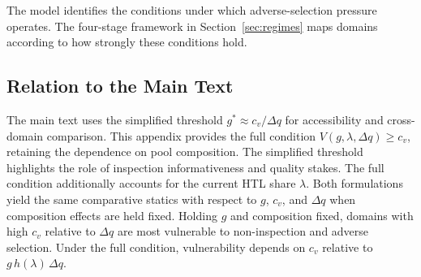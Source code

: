 \documentclass{article}
\theoremstyle{plain}
\theoremstyle{definition}
\theoremstyle{remark}
\begin{document}
The model identifies the conditions under which adverse-selection pressure operates. The four-stage framework in Section~\ref{sec:regimes} maps domains according to how strongly these conditions hold.

\subsection{Relation to the Main Text}
\label{app:relation}

The main text uses the simplified threshold $g^{\ast}\approx c_v/\Delta q$ for accessibility and cross-domain comparison. This appendix provides the full condition $V(g,\lambda,\Delta q)\geq c_v$, retaining the dependence on pool composition. The simplified threshold highlights the role of inspection informativeness and quality stakes. The full condition additionally accounts for the current HTL share $\lambda$. Both formulations yield the same comparative statics with respect to $g$, $c_v$, and $\Delta q$ when composition effects are held fixed. Holding $g$ and composition fixed, domains with high $c_v$ relative to $\Delta q$ are most vulnerable to non-inspection and adverse selection. Under the full condition, vulnerability depends on $c_v$ relative to $g\, h(\lambda)\,\Delta q$.
\end{document}
